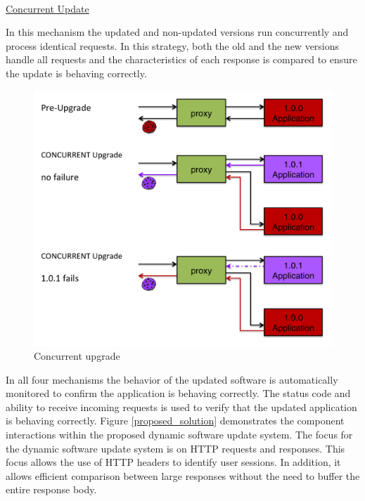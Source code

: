\documentclass[a4paper,11pt,twoside]{report}
\begin{document}
\noindent\\
\underline{Concurrent Update}

\noindent
In this mechanism the updated and non-updated versions run concurrently and process identical requests.  In this strategy, both the old and the new versions handle all requests and the characteristics of each response is compared to ensure the update is behaving correctly.

   
\begin{figure}[!ht]
  \centering
     \includegraphics[scale=0.30]{concurrent_upgrade}
  \caption{Concurrent upgrade}
  \label{concurrent_upgrade}
\end{figure}

In all four mechanisms the behavior of the updated software is automatically monitored to confirm the application is behaving correctly. The status code and ability to receive incoming requests is used to verify that the updated application is behaving correctly. Figure \ref{proposed_solution} demonstrates the component interactions within the proposed dynamic software update system. The focus for the dynamic software update system is on HTTP requests and responses.  This focus allows the use of HTTP headers to identify user sessions.  In addition, it allows efficient comparison between large responses without the need to buffer the entire response body.
\end{document}
